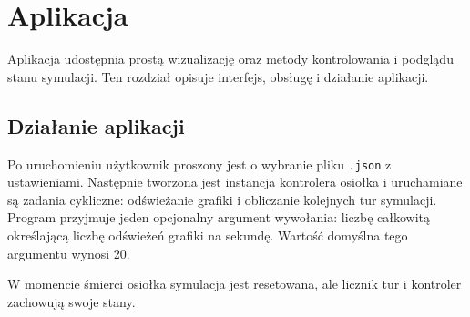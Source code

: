 

\chapter{Aplikacja}
Aplikacja udostępnia prostą wizualizację oraz metody kontrolowania i podglądu stanu symulacji. Ten rozdział opisuje interfejs, obsługę i działanie aplikacji.

\section{Działanie aplikacji}
Po uruchomieniu użytkownik proszony jest o wybranie pliku \texttt{.json} z ustawieniami. Następnie tworzona jest instancja kontrolera osiołka i uruchamiane są zadania cykliczne: odświeżanie grafiki i obliczanie kolejnych tur symulacji. Program przyjmuje jeden opcjonalny argument wywołania: liczbę całkowitą określającą liczbę odświeżeń grafiki na sekundę. Wartość domyślna tego argumentu wynosi 20.

W momencie śmierci osiołka symulacja jest resetowana, ale licznik tur i kontroler zachowują swoje stany.

\clearpage

